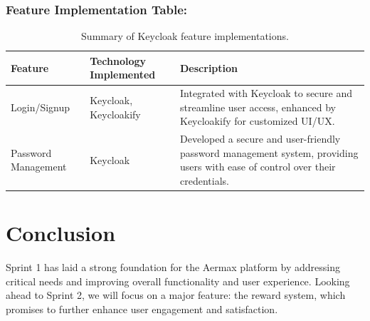 \subsubsection{Feature Implementation Table:}
\begin{table}[H]
\centering
\begin{tabularx}{\textwidth}{|X|X|X|}
\hline
\textbf{Feature} & \textbf{Technology Implemented} & \textbf{Description} \\
\hline
Login/Signup & Keycloak, Keycloakify & Integrated with Keycloak to secure and streamline user access, enhanced by Keycloakify for customized UI/UX. \\
\hline
Password Management & Keycloak & Developed a secure and user-friendly password management system, providing users with ease of control over their credentials. \\
\hline
\end{tabularx}
\caption{Summary of Keycloak feature implementations.}
\label{tab:keycloak_features}
\end{table}

\setcounter{secnumdepth}{0}
\section{Conclusion}
Sprint 1 has laid a strong foundation for the Aermax platform by addressing critical needs and improving overall functionality and user experience. Looking ahead to Sprint 2, we will focus on a major feature: the reward system, which promises to further enhance user engagement and satisfaction.


